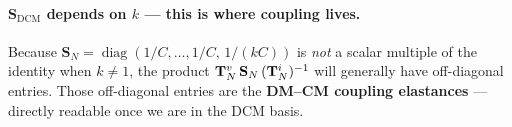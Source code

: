 \paragraph{$\mathbf{S}_{\mathrm{DCM}}$ depends on $k$ — this is where coupling lives.}

Because $\mathbf{S}_N = \operatorname{diag}(1/C,\ldots,1/C,\,1/(kC))$
is \emph{not} a scalar multiple of the identity when $k \neq 1$, the
product $\mathbf{T}^{v}_{N}\,\mathbf{S}_N\,(\mathbf{T}^{i}_{N})^{-1}$ will generally have
off-diagonal entries.  Those off-diagonal entries are the
\textbf{DM--CM coupling elastances} — directly readable once we are in
the DCM basis.

